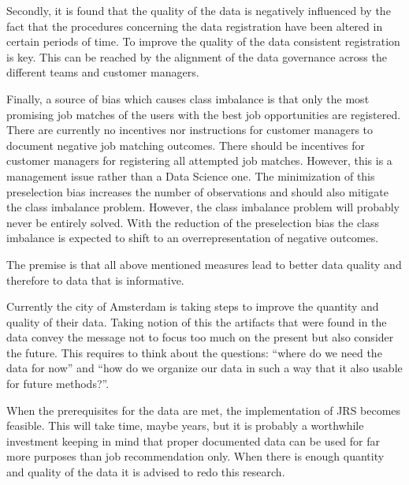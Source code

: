Secondly, it is found that the quality of the data is negatively influenced by the fact that the procedures concerning the data registration have been altered in certain periods of time. 
To improve the quality of the data consistent registration is key.
This can be reached by the alignment of the data governance across the different teams and customer managers.

Finally, a source of bias which causes class imbalance is that only the most promising job matches of the users with the best job opportunities are registered. 
There are currently no incentives nor instructions for customer managers to document negative job matching outcomes. 
There should be incentives for customer managers for registering all attempted job matches.
However, this is a management issue rather than a Data Science one.
The minimization of this preselection bias increases the number of observations and should also mitigate the class imbalance problem.
However, the class imbalance problem will probably never be entirely solved.
With the reduction of the preselection bias the class imbalance is expected to shift to an overrepresentation of negative outcomes.

The premise is that all above mentioned measures lead to better data quality and therefore to data that is informative.

Currently the city of Amsterdam is taking steps to improve the quantity and quality of their data. 
Taking notion of this the artifacts that were found in the data convey the message not to focus too much on the present but also consider the future.
This requires to think about the questions: “where do we need the data for now” and “how do we organize our data in such a way that it also usable for future methods?”.

When the prerequisites for the data are met, the implementation of JRS becomes feasible.
This will take time, maybe years, but it is probably a worthwhile investment keeping in mind that proper documented data can be used for far more purposes than job recommendation only.
When there is enough quantity and quality of the data it is advised to redo this research. 


